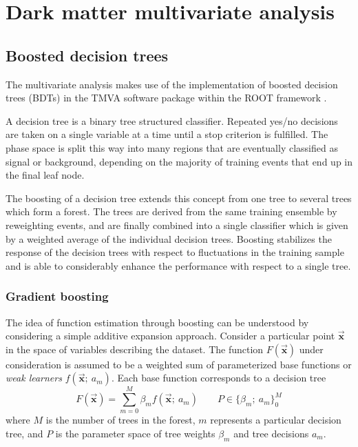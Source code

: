 \chapter{Dark matter multivariate analysis}
\label{app:mva}

\section{Boosted decision trees}

The multivariate analysis makes use of the implementation of boosted decision trees (BDTs) in the TMVA software package within the ROOT framework \cite{Hocker:2007ht}.

A decision tree is a binary tree structured classifier.
Repeated yes/no decisions are taken on a single variable at a time until a stop criterion is fulfilled.
The phase space is split this way into many regions that are eventually classified as signal or background, depending on the majority of training events that end up in the final leaf node.

The boosting of a decision tree extends this concept from one tree to several trees which form a forest. 
The trees are derived from the same training ensemble by reweighting events, and are finally combined into a single classifier which is given by a weighted average of the individual decision trees. 
Boosting stabilizes the response of the decision trees with respect to fluctuations in the training sample and is able to considerably enhance the performance with respect to a single tree. 

\subsection{Gradient boosting}
The idea of function estimation through boosting can be understood by considering a simple additive expansion approach.
Consider a particular point $\vec{\mathbf{x}}$ in the space of variables describing the dataset.
The function $F(\vec{\mathbf{x}})$ under consideration is assumed to be a weighted sum
of parameterized base functions or \textit{weak learners} $f(\vec{\mathbf{x}};\:a_m)$.
Each base function corresponds to a decision tree
\begin{equation}
F(\vec{\mathbf{x}}) = \sum_{m=0}^{M} \beta_m f(\vec{\mathbf{x}};\:a_m)\qquad P\in\{\beta_m;\:a_m\}^M_0
\end{equation}
where $M$ is the number of trees in the forest, $m$ represents a particular decision tree,
and $P$ is the parameter space of tree weights $\beta_m$ and tree decisions $a_m$.

